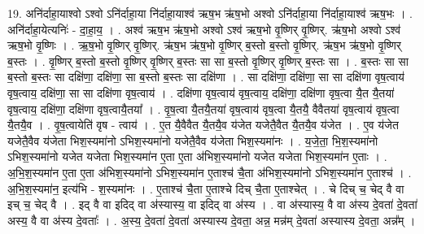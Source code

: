 \documentclass[17pt]{extarticle}
\begin{document}
19. अनि॑र्दाहा॒याश्वो ऽश्वो ऽनि॑र्दाहा॒या नि॑र्दाहा॒याश्व॑ ऋष॒भ ऋ॑ष॒भो अश्वो ऽनि॑र्दाहा॒या नि॑र्दाहा॒याश्व॑ ऋष॒भः । . अनि॑र्दाहा॒येत्यनिः॑ - दा॒हा॒य॒ । . अश्व॑ ऋष॒भ ऋ॑ष॒भो अश्वो ऽश्व॑ ऋष॒भो वृ॒ष्णिर् वृ॒ष्णिर्. ऋ॑ष॒भो अश्वो ऽश्व॑ ऋष॒भो वृ॒ष्णिः । . ऋ॒ष॒भो वृ॒ष्णिर् वृ॒ष्णिर्. ऋ॑ष॒भ ऋ॑ष॒भो वृ॒ष्णिर् ब॒स्तो ब॒स्तो वृ॒ष्णिर्. ऋ॑ष॒भ ऋ॑ष॒भो वृ॒ष्णिर् ब॒स्तः । . वृ॒ष्णिर् ब॒स्तो ब॒स्तो वृ॒ष्णिर् वृ॒ष्णिर् ब॒स्तः सा सा ब॒स्तो वृ॒ष्णिर् वृ॒ष्णिर् ब॒स्तः सा । . ब॒स्तः सा सा ब॒स्तो ब॒स्तः सा दक्षि॑णा॒ दक्षि॑णा॒ सा ब॒स्तो ब॒स्तः सा दक्षि॑णा । . सा दक्षि॑णा॒ दक्षि॑णा॒ सा सा दक्षि॑णा वृष॒त्वाय॑ वृष॒त्वाय॒ दक्षि॑णा॒ सा सा दक्षि॑णा वृष॒त्वाय॑ । . दक्षि॑णा वृष॒त्वाय॑ वृष॒त्वाय॒ दक्षि॑णा॒ दक्षि॑णा वृष॒त्वा यै॒त यै॒तया॑ वृष॒त्वाय॒ दक्षि॑णा॒ दक्षि॑णा वृष॒त्वायै॒तया᳚ । . वृ॒ष॒त्वा यै॒तयै॒तया॑ वृष॒त्वाय॑ वृष॒त्वा यै॒तयै॒ वैवैतया॑ वृष॒त्वाय॑ वृष॒त्वा यै॒तयै॒व । . वृ॒ष॒त्वायेति॑ वृष - त्वाय॑ । . ए॒त यै॒वैवैत यै॒तयै॒व य॑जेत यजेतै॒वैत यै॒तयै॒व य॑जेत । . ए॒व य॑जेत यजेतै॒वैव य॑जेता भिश॒स्यमा॑नो ऽभिश॒स्यमा॑नो यजेतै॒वैव य॑जेता भिश॒स्यमा॑नः । . य॒जे॒ता॒ भि॒श॒स्यमा॑नो ऽभिश॒स्यमा॑नो यजेत यजेता भिश॒स्यमा॑न ए॒ता ए॒ता अ॑भिश॒स्यमा॑नो यजेत यजेता भिश॒स्यमा॑न ए॒ताः । . अ॒भि॒श॒स्यमा॑न ए॒ता ए॒ता अ॑भिश॒स्यमा॑नो ऽभिश॒स्यमा॑न ए॒ताश्च॑ चै॒ता अ॑भिश॒स्यमा॑नो ऽभिश॒स्यमा॑न ए॒ताश्च॑ । . अ॒भि॒श॒स्यमा॑न॒ इत्य॑भि - श॒स्यमा॑नः । . ए॒ताश्च॑ चै॒ता ए॒ताश्चे दिच् चै॒ता ए॒ताश्चेत् । . चे दिच् च॒ चेद् वै वा इच् च॒ चेद् वै । . इद् वै वा इदिद् वा अ॑स्यास्य॒ वा इदिद् वा अ॑स्य । . वा अ॑स्यास्य॒ वै वा अ॑स्य दे॒वता॑ दे॒वता॑ अस्य॒ वै वा अ॑स्य दे॒वताः᳚ । . अ॒स्य॒ दे॒वता॑ दे॒वता॑ अस्यास्य दे॒वता॒ अन्न॒ मन्न॑म् दे॒वता॑ अस्यास्य दे॒वता॒ अन्न᳚म् । \newline
\end{document}
